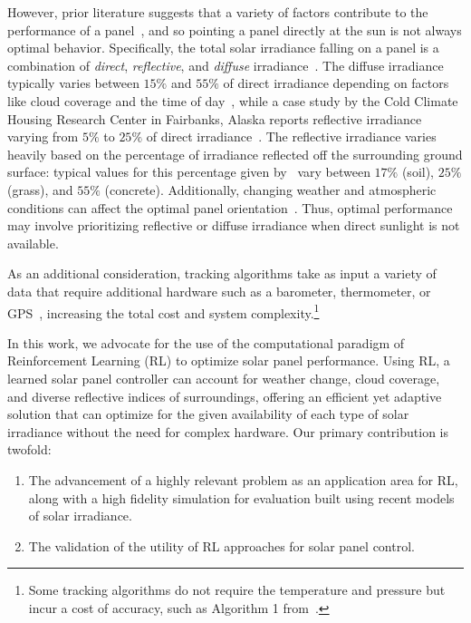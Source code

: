 \documentclass{article}
\begin{document}
However, prior literature suggests that a variety of factors contribute to the performance of a panel~\cite{King2001}, and so pointing a panel directly at the sun is not always optimal behavior. Specifically, the total solar irradiance falling on a panel is a combination of {\it direct}, {\it reflective}, and {\it diffuse} irradiance~\cite{Benghanem2011}. The diffuse irradiance typically varies between $15\%$ and $55\%$ of direct irradiance depending on factors like cloud coverage and the time of day~\cite{peterson1981ratio}, while a case study by the Cold Climate Housing Research Center in Fairbanks, Alaska reports reflective irradiance varying from $5\%$ to $25\%$ of direct irradiance~\cite{colgan2010}. The reflective irradiance varies heavily based on the percentage of irradiance reflected off the surrounding ground surface: typical values for this percentage given by~\citet{mcevoy2003practical} vary between $17\%$ (soil), $25\%$ (grass), and $55\%$ (concrete). Additionally, changing weather and atmospheric conditions can affect the optimal panel orientation~\cite{Kelly2009}. Thus, optimal performance may involve prioritizing reflective or diffuse irradiance when direct sunlight is not available.

As an additional consideration, tracking algorithms take as input a variety of data that require additional hardware such as a barometer, thermometer, or GPS~\cite{Grena2012}, increasing the total cost and system complexity.\footnote{Some tracking algorithms do not require the temperature and pressure but incur a cost of accuracy, such as Algorithm 1 from~\citet{Grena2012}.}

In this work, we advocate for the use of the computational paradigm of Reinforcement Learning (RL) to optimize solar panel performance. Using RL, a learned solar panel controller can account for weather change, cloud coverage, and diverse reflective indices of surroundings, offering an efficient yet adaptive solution that can optimize for the given availability of each type of solar irradiance without the need for complex hardware. Our primary contribution is twofold:
\begin{enumerate}
\item The advancement of a highly relevant problem as an application area for RL, along with a high fidelity simulation for evaluation built using recent models of solar irradiance.
\item The validation of the utility of RL approaches for solar panel control.
\end{enumerate}
\end{document}
